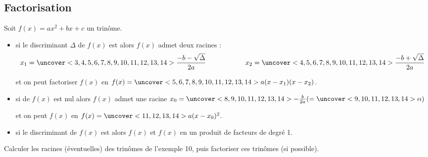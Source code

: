 \documentclass{beamer}
\begin{document}
\subsection{Factorisation}

  \begin{frame}
    \begin{theorem}[Central]
    Soit $f(x)=ax^2+bx+c$ un trinôme.
    \begin{itemize}
      \item  si le discriminant $\Delta$ de $f(x)$ est 
       alors $f(x)$ admet deux racines :
      $$x_1=\uncover<3,4,5,6,7,8,9,10,11,12,13,14>{\frac{-b-\sqrt{\Delta}}{2a}} 
      \hspace{2cm} x_2=
      \uncover<4,5,6,7,8,9,10,11,12,13,14>{\frac{-b+\sqrt{\Delta}}{2a}}$$
     
      et on peut factoriser $f(x)$ en $f(x)=
      \uncover<5,6,7,8,9,10,11,12,13,14>{a(x-x_1)(x-x_2)}$.
     
      \item si  de $f(x)$ est nul alors $f(x)$ admet une racine 
     $x_0=\uncover<8,9,10,11,12,13,14>{-\frac{b}{2a}}(=\uncover<9,10,11,12,13,14>{\alpha})$
     
     et on peut  $f(x)$ en $f(x)=
     \uncover<11,12,13,14>{a(x-x_0)^2}$.
     \item si le discriminant de $f(x)$ est  
     alors $f(x)$  et 
      $f(x)$ en un produit de facteurs de degré 1.
    \end{itemize}    
  \end{theorem}
  \end{frame}


\begin{frame}
  \begin{example}
    Calculer les racines (éventuelles) des trinômes de l'exemple 10, puis factoriser
    ces trinômes (si possible).
   \end{example}
\end{frame}
\end{document}
